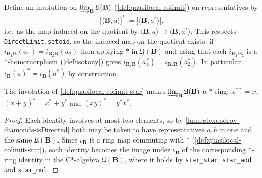 \begin{definition}
    \label{def:quasilocal-colimit-star}
    Define an involution on $\varinjlim_{\mathbf{B}} \mathfrak{U}(\mathbf{B})$ (\ref{def:quasilocal-colimit}) on representatives by
    \begin{align}
        \bigl[\langle \mathbf{B}, a\rangle\bigr]^{*} := \bigl[\langle \mathbf{B}, a^{*}\rangle\bigr],
    \end{align}
    i.e.\ as the map induced on the quotient by $\langle \mathbf{B}, a\rangle \mapsto \langle \mathbf{B}, a^{*}\rangle$. This respects \texttt{DirectLimit.setoid}, so the induced map on the quotient exists: if $i_{\mathbf{B}_1\mathbf{B}}(a_1) = i_{\mathbf{B}_2\mathbf{B}}(a_2)$ then applying $*$ in $\mathfrak{U}(\mathbf{B})$ and using that each $i_{\mathbf{B}_1\mathbf{B}_2}$ is a $*$-homomorphism (\ref{def:isotony}) gives $i_{\mathbf{B}_1\mathbf{B}}(a_1^{*}) = i_{\mathbf{B}_2\mathbf{B}}(a_2^{*})$. In particular $\iota_{\mathbf{B}}(a)^{*} = \iota_{\mathbf{B}}(a^{*})$ by construction.
\end{definition}

\begin{lemma}
    \label{lmm:quasilocal-colimit-star-ring}
    The involution of \ref{def:quasilocal-colimit-star} makes $\varinjlim_{\mathbf{B}} \mathfrak{U}(\mathbf{B})$ a $*$-ring: $x^{**} = x$, $(x+y)^{*} = x^{*} + y^{*}$ and $(xy)^{*} = y^{*} x^{*}$.
\end{lemma}
\begin{proof}
    Each identity involves at most two elements, so by \ref{lmm:alexandrov-diamonds-isDirected} both may be taken to have representatives $a, b$ in one and the same $\mathfrak{U}(\mathbf{B})$. Since $\iota_{\mathbf{B}}$ is a ring map commuting with $*$ (\ref{def:quasilocal-colimit-star}), each identity becomes the image under $\iota_{\mathbf{B}}$ of the corresponding $*$-ring identity in the C*-algebra $\mathfrak{U}(\mathbf{B})$, where it holds by \texttt{star\_star}, \texttt{star\_add} and \texttt{star\_mul}.
\end{proof}

